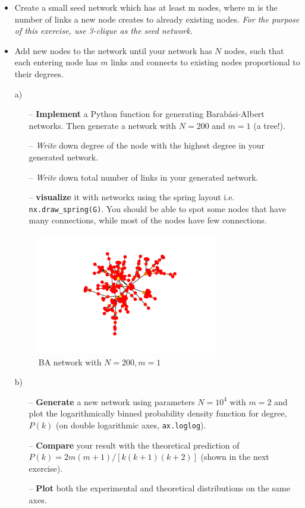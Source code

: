 \documentclass[a4paper,12pt]{article}
\begin{document}
\begin{itemize}
\item Create a small seed network which has at least m nodes, where m is the number of links a
  new node creates to already existing nodes. \textit{For the purpose of this exercise, use 3-clique as the seed network.}
\item Add new nodes to the network until your network has $N$ nodes, such that each entering node has $m$ links and connects to existing nodes proportional to their degrees.
\item[a) ]
  \begin{itemize}
    \item[--] \textbf{Implement} a Python function for generating Barabási-Albert networks. Then generate a network with $N = 200$ and $m = 1$ (a tree!).
    \item[--] \textit{Write} down degree of the node with the highest degree in your generated network.
    \item[--] \textit{Write} down total number of links in your generated network.
    \item[--] \textbf{visualize} it with networkx using the spring layout i.e. \texttt{nx.draw\_spring(G)}. You should be able to spot some nodes that have many connections, while most of the
nodes have few connections.
\end{itemize}

\begin{figure}
  \centering
  \includegraphics[width=0.75\textwidth]{assets/BA_visualized.pdf}
    \caption{BA network with $N = 200, m = 1$}
\end{figure}


\item[b) ]

\begin{itemize}
\item[--] \textbf{Generate} a new network using parameters $N = 10^4$ with $m = 2$ and plot the logarithmically binned probability density function for degree, $P(k)$ (on double logarithmic axes, \texttt{ax.loglog}).
\item[--] \textbf{Compare} your result with the theoretical prediction of $P(k) = 2m (m + 1) / [k (k + 1) (k + 2)]$ (shown in the next exercise).
\item[--] \textbf{Plot} both the experimental and theoretical distributions on the same axes.
\end{itemize}


\end{itemize}
\end{document}
